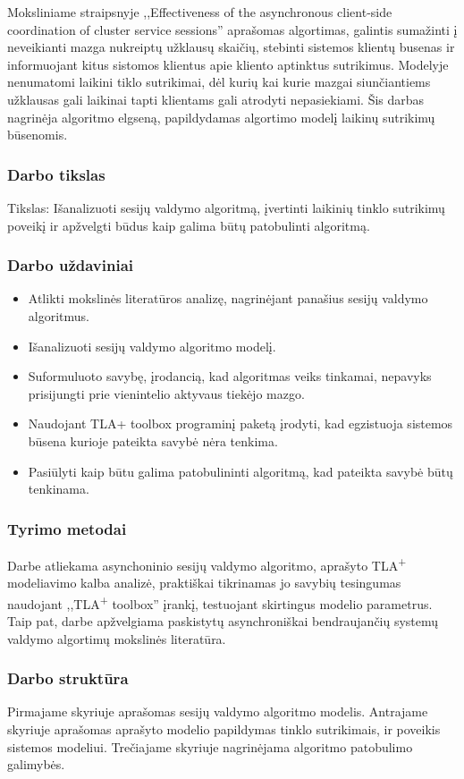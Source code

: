   Moksliniame straipsnyje ,,Effectiveness of the asynchronous client-side coordination of cluster service sessions'' aprašomas algortimas,
  galintis sumažinti į neveikianti mazga nukreiptų užklausų skaičių, stebinti sistemos klientų busenas 
  ir informuojant kitus sistomos klientus apie kliento aptinktus sutrikimus.
  Modelyje nenumatomi laikini tiklo sutrikimai, dėl kurių kai kurie mazgai siunčiantiems užklausas gali laikinai tapti klientams gali atrodyti nepasiekiami.
  Šis darbas nagrinėja algoritmo elgseną, papildydamas algortimo modelį laikinų sutrikimų būsenomis.


\subsubsection*{Darbo tikslas}

  Tikslas: Išanalizuoti sesijų valdymo algoritmą, įvertinti laikinių tinklo sutrikimų poveikį ir apžvelgti būdus kaip galima būtų patobulinti algoritmą.

\subsubsection*{Darbo uždaviniai}
    
  \begin{itemize}
    \item Atlikti mokslinės literatūros analizę, nagrinėjant panašius sesijų valdymo algoritmus.
    \item Išanalizuoti sesijų valdymo algoritmo modelį.
    \item Suformuluoto savybę, įrodancią, kad algoritmas veiks tinkamai, nepavyks prisijungti prie vienintelio aktyvaus tiekėjo mazgo.
    \item Naudojant TLA+ toolbox programinį paketą įrodyti, kad egzistuoja sistemos būsena kurioje pateikta savybė nėra tenkima.
    \item Pasiūlyti kaip būtu galima patobulininti algoritmą, kad pateikta savybė būtų tenkinama.
  \end{itemize}



\subsubsection*{Tyrimo metodai}

  Darbe atliekama asynchoninio sesijų valdymo algoritmo, aprašyto TLA\textsuperscript{+} modeliavimo kalba analizė, 
    praktiškai tikrinamas jo savybių tesingumas naudojant ,,TLA\textsuperscript{+} toolbox'' įrankį, 
    testuojant skirtingus modelio parametrus.
  Taip pat, darbe apžvelgiama paskistytų asynchroniškai bendraujančių systemų valdymo algortimų mokslinės literatūra. 

\subsubsection*{Darbo struktūra}

Pirmajame skyriuje aprašomas sesijų valdymo algoritmo modelis. 
Antrajame skyriuje aprašomas aprašyto modelio papildymas tinklo sutrikimais, ir poveikis sistemos modeliui. 
Trečiajame skyriuje nagrinėjama algoritmo patobulimo galimybės.